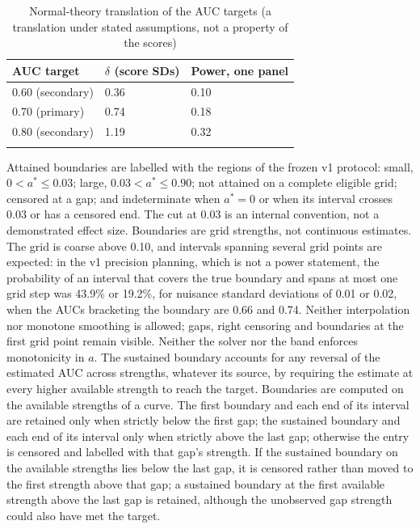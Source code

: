 \begin{table}[h]
\caption{Normal-theory translation of the AUC targets (a translation under stated assumptions, not a property of the scores)}\label{tab:auc-translation}
\begin{tabular}{@{}lll@{}}
\toprule
AUC target & $\delta$ (score SDs) & Power, one panel \\
\midrule
0.60 (secondary) & 0.36 & 0.10 \\
0.70 (primary) & 0.74 & 0.18 \\
0.80 (secondary) & 1.19 & 0.32 \\
\botrule
\end{tabular}
\end{table}

Attained boundaries are labelled with the regions of the frozen v1 protocol: small, $0<a^*\le0.03$; large, $0.03<a^*\le0.90$; not attained on a complete eligible grid; censored at a gap; and indeterminate when $a^*=0$ or when its interval crosses 0.03 or has a censored end. %
The cut at 0.03 is an internal convention, not a demonstrated effect size. %
Boundaries are grid strengths, not continuous estimates. %
The grid is coarse above 0.10, and intervals spanning several grid points are expected: in the v1 precision planning, which is not a power statement, the probability of an interval that covers the true boundary and spans at most one grid step was 43.9\% or 19.2\%, for nuisance standard deviations of 0.01 or 0.02, when the AUCs bracketing the boundary are 0.66 and 0.74. %
Neither interpolation nor monotone smoothing is allowed; gaps, right censoring and boundaries at the first grid point remain visible. %
Neither the solver nor the band enforces monotonicity in $a$. The sustained boundary accounts for any reversal of the estimated AUC across strengths, whatever its source, by requiring the estimate at every higher available strength to reach the target. %
Boundaries are computed on the available strengths of a curve. %
The first boundary and each end of its interval are retained only when strictly below the first gap; the sustained boundary and each end of its interval only when strictly above the last gap; otherwise the entry is censored and labelled with that gap's strength. %
If the sustained boundary on the available strengths lies below the last gap, it is censored rather than moved to the first strength above that gap; a sustained boundary at the first available strength above the last gap is retained, although the unobserved gap strength could also have met the target. %

